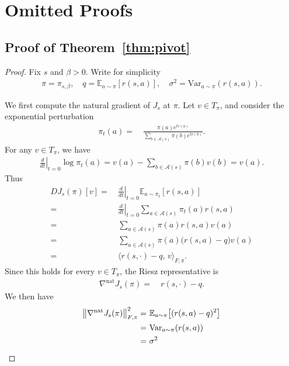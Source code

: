 \section{Omitted Proofs}

\subsection{Proof of Theorem~\ref{thm:pivot}}


\begin{proof}
Fix $s$ and $\beta>0$. Write for simplicity
\begin{align*}
\pi = \pi_{s,\beta}, \quad
q = \mathbb E_{a\sim\pi}[r(s,a)], \quad
\sigma^2 = \mathrm{Var}_{a\sim\pi}(r(s,a)).
\end{align*}

We first compute the natural gradient of $J_s$ at $\pi$.
Let $v\in T_\pi$, and consider the exponential perturbation
\begin{align*}
\pi_t(a)= &~ \frac{\pi(a)e^{t v(a)}}{\sum_{b\in\mathcal{A}(s) }\pi(b)e^{t v(b)}}.
\end{align*}
For any $v\in T_\pi$, we have
\begin{align*}
\left.\frac{d}{dt}\right|_{t=0}\log \pi_t(a)
= v(a)-\sum_{b\in\mathcal{A}(s) }\pi(b)v(b)
= v(a).
\end{align*}
Thus
\begin{align*}
DJ_s(\pi)[v]
= &~ \left.\frac{d}{dt}\right|_{t=0}\mathbb E_{a\sim\pi_t}[r(s,a)] \\
= &~ \left.\frac{d}{dt}\right|_{t=0}\sum_{a\in\mathcal{A}(s) }\pi_t(a)r(s,a) \\
= &~ \sum_{a\in\mathcal{A}(s) }\pi(a)r(s,a)v(a) \\
= &~ \sum_{a\in\mathcal{A}(s) }\pi(a)\bigl(r(s,a)-q\bigr)v(a) \\
= &~ \langle r(s,\cdot)-q,\,v\rangle_{F,\pi}.
\end{align*}
Since this holds for every $v\in T_\pi$, the Riesz representative is
\begin{align*}
\nabla^{\mathrm{nat}}J_s(\pi)= &~ r(s,\cdot)-q.
\end{align*}
We then have
\begin{align}\label{eq:norm-natural-J}
\bigl\|\nabla^{\mathrm{nat}}J_s(\pi)\bigr\|_{F,\pi}^2
= &~ \mathbb E_{a\sim\pi}\bigl[(r(s,a)-q)^2\bigr] \notag\\
= &~ \mathrm{Var}_{a\sim\pi}(r(s,a)) \notag\\
= &~ \sigma^2
\end{align}


\end{proof}
